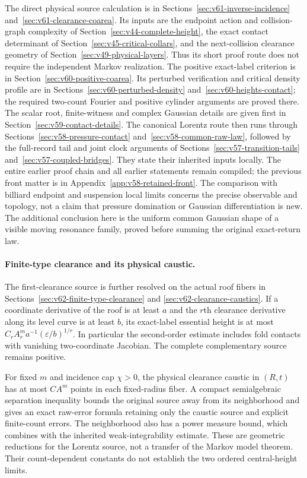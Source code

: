 \documentclass[11pt,reqno]{amsart}
\numberwithin{equation}{section}
\theoremstyle{definition}\newtheorem{definition}[theorem]{Definition}
\theoremstyle{remark}\newtheorem{remark}[theorem]{Remark}
\begin{document}
The direct physical source calculation is in
Sections~\ref{sec:v61-inverse-incidence} and~\ref{sec:v61-clearance-coarea}.
Its inputs are the endpoint action and collision-graph complexity of
Section~\ref{sec:v44-complete-height}, the exact contact determinant of
Section~\ref{sec:v45-critical-collars}, and the next-collision clearance
geometry of Section~\ref{sec:v49-physical-layers}. Thus its short proof
route does not require the independent Markov realization.
The positive exact-label criterion is in
Section~\ref{sec:v60-positive-coarea}. Its perturbed verification and
critical density profile are in Sections~\ref{sec:v60-perturbed-density}
and~\ref{sec:v60-heights-contact}; the required two-count Fourier and
positive cylinder arguments are proved there. The scalar root,
finite-witness and complex Gaussian details are given
first in Section~\ref{sec:v59-contact-details}. The canonical Lorentz
route then runs through Sections~\ref{sec:v58-pressure-contact}
and~\ref{sec:v58-common-raw-law}, followed by the full-record tail
and joint clock arguments of
Sections~\ref{sec:v57-transition-tails} and~\ref{sec:v57-coupled-bridges}.
They state their inherited inputs locally. The entire earlier proof
chain and all earlier statements remain compiled; the previous front
matter is in Appendix~\ref{app:v58-retained-front}.
The comparison with billiard endpoint and suspension local limits
\cite{DPZ,DN} concerns the precise observable and topology, not a
claim that pressure domination or Gaussian differentiation is new.
The additional conclusion here is the uniform common Gaussian shape
of a visible moving resonance family, proved before summing the
original exact-return law.

\paragraph{Finite-type clearance and its physical caustic.}
The first-clearance source is further resolved on the actual roof
fibers in Sections~\ref{sec:v62-finite-type-clearance} and
\ref{sec:v62-clearance-caustics}. If a coordinate derivative of the
roof is at least $a$ and the $r$th clearance derivative along its level
curve is at least $b$, its exact-label essential height is at most
$C_rA_r^m a^{-1}(\varepsilon/b)^{1/r}$. In particular the second-order
estimate includes fold contacts with vanishing two-coordinate
Jacobian. The complete complementary source remains positive.

For fixed $m$ and incidence cap $\chi>0$, the physical clearance
caustic in $(R,t)$ has at most $CA^m$ points in each fixed-radius
fiber. A compact semialgebraic separation inequality bounds the
original source away from its neighborhood and gives an exact
raw-error formula retaining only the caustic source and explicit
finite-count errors. The neighborhood also has a power measure bound,
which combines with the inherited weak-integrability estimate.
These are geometric reductions for the Lorentz source, not a transfer
of the Markov model theorem. Their count-dependent constants do not
establish the two ordered central-height limits.
\end{document}
